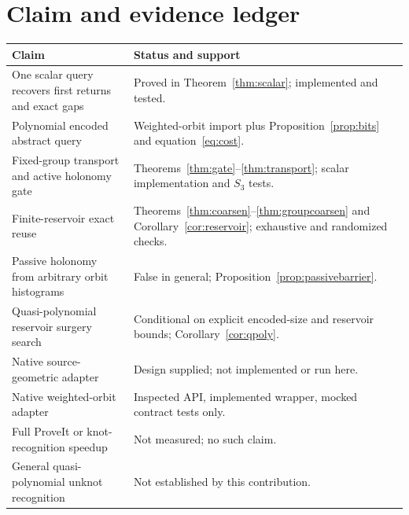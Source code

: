 \documentclass[11pt]{article}
\theoremstyle{definition}\newtheorem{definition}[theorem]{Definition}\newtheorem{example}[theorem]{Example}
\theoremstyle{remark}\newtheorem{remark}[theorem]{Remark}
\begin{document}
\section{Claim and evidence ledger}
\begin{center}\small
\begin{tabularx}{\textwidth}{@{}lX@{}}\toprule
Claim & Status and support\\\midrule
One scalar query recovers first returns and exact gaps & Proved in Theorem~\ref{thm:scalar}; implemented and tested.\\
Polynomial encoded abstract query & Weighted-orbit import plus Proposition~\ref{prop:bits} and equation~\eqref{eq:cost}.\\
Fixed-group transport and active holonomy gate & Theorems~\ref{thm:gate}--\ref{thm:transport}; scalar implementation and $S_3$ tests.\\
Finite-reservoir exact reuse & Theorems~\ref{thm:coarsen}--\ref{thm:groupcoarsen} and Corollary~\ref{cor:reservoir}; exhaustive and randomized checks.\\
Passive holonomy from arbitrary orbit histograms & False in general; Proposition~\ref{prop:passivebarrier}.\\
Quasi-polynomial reservoir surgery search & Conditional on explicit encoded-size and reservoir bounds; Corollary~\ref{cor:qpoly}.\\
Native source-geometric adapter & Design supplied; not implemented or run here.\\
Native weighted-orbit adapter & Inspected API, implemented wrapper, mocked contract tests only.\\
Full ProveIt or knot-recognition speedup & Not measured; no such claim.\\
General quasi-polynomial unknot recognition & Not established by this contribution.\\\bottomrule
\end{tabularx}
\end{center}
\end{document}
